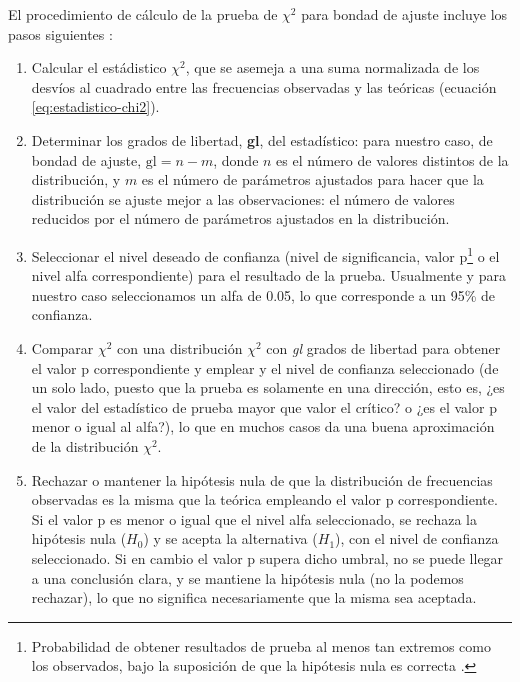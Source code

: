 El procedimiento de cálculo de la prueba de $\chi^{2}$ para bondad de ajuste incluye los pasos siguientes \cite{enwiki2022pearson}:
\begin{enumerate}
  \item Calcular el estádistico $\chi^{2}$, que se asemeja a una suma normalizada de los desvíos al cuadrado entre las frecuencias observadas y las teóricas (ecuación \ref{eq:estadistico-chi2}).
  \item Determinar los grados de libertad, \textbf{gl}, del estadístico: para nuestro caso, de bondad de ajuste, $\text{gl} = n - m$, donde $n$ es el número de valores distintos de la distribución, y $m$ es el número de parámetros ajustados para hacer que la distribución se ajuste mejor a las observaciones: el número de valores reducidos por el número de parámetros ajustados en la distribución.
  \item Seleccionar el nivel deseado de confianza (nivel de significancia, valor p\footnote{Probabilidad de obtener resultados de prueba al menos tan extremos como los observados, bajo la suposición de que la hipótesis nula es correcta \cite{enwiki2022pvalue}.} o el nivel alfa correspondiente) para el resultado de la prueba. Usualmente y para nuestro caso seleccionamos un alfa de 0.05, lo que corresponde a un 95\% de confianza.
  \item Comparar $\chi^{2}$ con una distribución $\chi^{2}$ con \emph{gl} grados de libertad para obtener el valor p correspondiente y emplear y el nivel de confianza seleccionado (de un solo lado, puesto que la prueba es solamente en una dirección, esto es, ¿es el valor del estadístico de prueba mayor que valor el crítico? o ¿es el valor p menor o igual al alfa?), lo que en muchos casos da una buena aproximación de la distribución $\chi^{2}$.
  \item Rechazar o mantener la hipótesis nula de que la distribución de frecuencias observadas es la misma que la teórica empleando el valor p correspondiente. Si el valor p es menor o igual que el nivel alfa seleccionado, se rechaza la hipótesis nula ($H_{0}$) y se acepta la alternativa ($H_{1}$), con el nivel de confianza seleccionado. Si en cambio el valor p supera dicho umbral, no se puede llegar a una conclusión clara, y se mantiene la hipótesis nula (no la podemos rechazar), lo que no significa necesariamente que la misma sea aceptada.
\end{enumerate}

